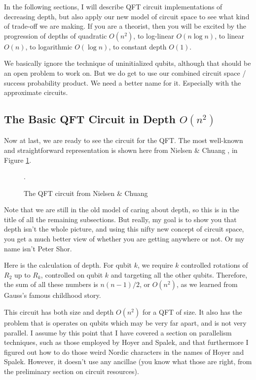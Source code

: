 In the following sections, I will describe QFT circuit implementations of
decreasing depth, but also apply our new model of circuit space to see what
kind of trade-off we are making. If you are a theorist, then you will be
excited by the progression of depths of quadratic $O(n^2)$, to log-linear
$O(n\log n)$, to linear $O(n)$, to logarithmic $O(\log n)$, to constant
depth $O(1)$.

We basically ignore the technique of uninitialized qubits, although that
should be an open problem to work on. But we do get to use our combined
circuit space / success probability product. We need a better name for it.
Especially with the approximate circuits.

\subsection{The Basic QFT Circuit in Depth $O(n^2)$}

Now at last, we are ready to see the circuit for the QFT. The most well-known
and straightforward representation is shown here from Nielsen \& Chuang
\cite{Nielsen2000}, in Figure \ref{fig:qft-circuit}.

\begin{figure}
\label{fig:qft-circuit}
\caption{The QFT circuit from Nielsen \& Chuang \cite{Nielsen2000}}.
\end{figure}

Note that we are still in the old model of caring about depth, so this is
in the title of all the remaining subsections. But really, my goal is to show
you that depth isn't the whole picture, and using this nifty new concept of
circuit space, you get a much better view of whether you are getting anywhere
or not. Or my name isn't Peter Shor.

Here is the calculation of depth. For qubit $k$, we require $k$ controlled
rotations of $R_2$ up to $R_k$, controlled on qubit $k$ and targeting all
the other qubits. Therefore, the sum of all these numbers is $n(n-1)/2$, 
or $O(n^2)$, as we learned from Gauss's famous childhood story.

This circuit has both size and depth $O(n^2)$ for a QFT of size. It also
has the problem that is operates on qubits which may be very far apart, and
is not very parallel. I assume by this point that I have covered a section
on parallelism techniques, such as those employed by Hoyer and Spalek, and that
furthermore I figured out how to do those weird Nordic characters in the names of
Hoyer and Spalek. However, it doesn't use any ancillae (you know what those
are right, from the preliminary section on circuit resources).


